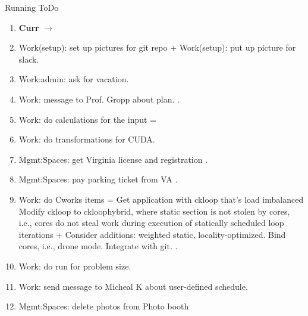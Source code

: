 \begin{frame}
\begin{columns}
\begin{column}{0.5\linewidth}
      \begin{block}{Running ToDo} %
        \begin{enumerate}
          
           
          \tiny \item \tiny \textbf{Curr} $\rightarrow$
        \item \tiny Work(setup): set up pictures for git repo +
          Work(setup): put up picture for slack. 
          
        \item \tiny Work:admin: ask for vacation.   

        \item \tiny Work: message to Prof. Gropp about plan.   . 
        \item \tiny Work: do calculations for the input =   
        \item \tiny Work: do transformations for CUDA.  


        \item \tiny Mgmt:Spaces: get Virginia license and registration . 

        \item \tiny Mgmt:Spaces: pay parking ticket from VA 
          . 


        \item \tiny Work: do Cworks items = Get application with
          ckloop that’s load imbalanced Modify ckloop to ckloophybrid, where
          static section is not stolen by cores, i.e., cores do not steal
          work during execution of statically scheduled loop iterations +
          Consider additions: weighted static, locality-optimized. Bind
          cores, i.e., drone mode. Integrate with git.  
           . 

        \item \tiny Work: do run for problem size.  

        \item \tiny Work: send message to Micheal K about user-defined
          schedule.  


        \item \tiny Mgmt:Spaces: delete photos from Photo booth  
      

\end{enumerate}
\end{block}
\end{column}
\end{columns}
\end{frame}
